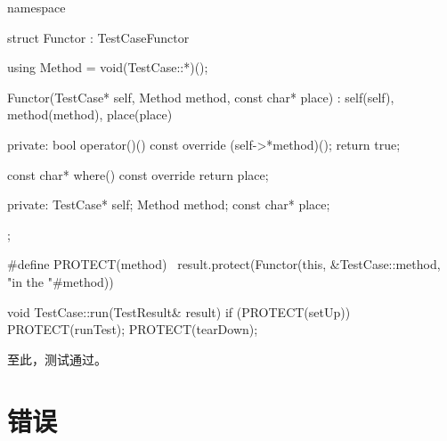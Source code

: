 \begin{content}
\begin{leftbar}
 \begin{c++}[caption={\ttfamily{src/mars/core/TestResult.cc}}]
namespace {
  struct Functor : TestCaseFunctor {
    using Method = void(TestCase::*)();

    Functor(TestCase* self, Method method, const char* place)
      : self(self), method(method), place(place) {
    }

  private:
    bool operator()() const override {
      (self->*method)();
      return true;
    }

    const char* where() const override {
      return place;
    }

  private:
    TestCase* self;
    Method method;
    const char* place;
  };
}

#define PROTECT(method) \
    result.protect(Functor(this, &TestCase::method, "in the "#method))

void TestCase::run(TestResult& result) {
  if (PROTECT(setUp)) {
    PROTECT(runTest);
  }
  PROTECT(tearDown);
}
 \end{c++}
\end{leftbar}

至此，测试通过。

\end{content}

\section{错误}

